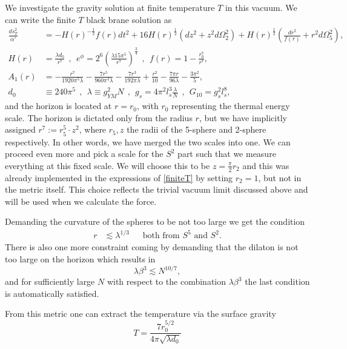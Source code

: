 \documentclass[11pt,english]{article}
\newcommand{\be}{\begin{equation}}
\newcommand{\ee}{\end{equation}}
\def\nn{\nonumber}
\numberwithin{equation}{section}
\begin{document}
 We investigate the gravity solution at finite temperature $T$ in this vacuum. We can write the finite $T$ black brane solution as 
\begin{align}\label{finiteT} \nn
\frac{ds^2_T}{\alpha'}&=-H(r)^{-\frac{1}{2}}f(r)dt^2+16H(r)^{\frac{1}{2}}\left(dz^2+z^2d\Omega_2^2\right)+H(r)^{\frac{1}{2}}\left(\frac{dr^2}{f(r)}+r^2d\Omega_5^2\right),\\
\nn H(r)&=\frac{\lambda d_0}{r^7}~~,~~ e^\phi =2^6\left(\frac{\lambda 15\pi^5}{r^7}\right)^\frac{3}{4}~~,~~f(r)=1-\frac{r_0^7}{r^7},\\
\nn A_1(r)&=-\frac{r^7}{1920\pi^5\lambda}-\frac{7r^5}{960\pi^3\lambda}-\frac{7r^3}{192\pi \lambda}+\frac{r^2}{10}-\frac{7\pi r}{96\lambda}-\frac{3\pi^2}{5},\\
d_0&\equiv 240\pi^5~~,~~\lambda\equiv g^2_{YM}N~~,~~g_s=4\pi^2l_s^3\frac{\lambda}{N}~~,~~G_{10}=g_s^2l_s^8,
\end{align}
and the horizon is located at $r=r_0$, with $r_0$ representing the thermal energy scale.  The horizon is dictated only from the radius $r$, but we have implicitly assigned  $r^7:=r_5^5\cdot z^2$, where $r_5, z$ the radii of the 5-sphere and 2-sphere respectively. In other words, we have merged the two scales into one. We can proceed even more and pick a scale for the $S^2$ part such that we measure everything at this fixed scale. We will choose this to be $z=\frac{\pi}{2}r_2$ and this was already implemented in the expressions of \eqref{finiteT} by setting $r_2=1$, but not in the metric itself.  This choice reflects the trivial vacuum limit discussed above and will be used when we calculate the force.

\noindent
 Demanding the curvature of the spheres to be not too large  we get the condition 
\begin{align}
r&\lesssim \lambda^{1/3} ~~~~~~~\text{both from $S^5$ and $S^2$}.
\end{align}
 There is also one more constraint coming by demanding that the dilaton is not too large on the horizon which results in 
\be 
\lambda \beta^3\lesssim N^{10/7},
\ee
and for sufficiently large $N$ with respect to the combination $\lambda\beta^3$ the last condition is automatically satisfied.

\noindent
From this metric one can extract the temperature via the surface gravity 
\be 
T=\frac{7 r_0^{5/2}}{4\pi \sqrt{\lambda d_0}}
\ee 
\end{document}
